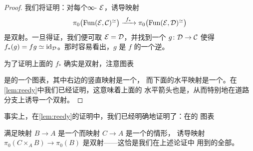 \begin{proof}
我们将证明：对每个∞-\trCategory{} $\mathcal{E}$，诱导映射
\[
\pi_0\bigl(\mathrm{Fun}(\mathcal{E}, \mathcal{C})^{\simeq}\bigr) \xrightarrow{\ f_*\ }
\pi_0\bigl(\mathrm{Fun}(\mathcal{E}, \mathcal{D})^{\simeq}\bigr)
\]
是双射。一旦得证，我们便可取 $\mathcal{E} = \mathcal{D}$，并找到一个\trFunctor{} $g\colon \mathcal{D} \to \mathcal{C}$
使得 $f_*(g) = fg \simeq \mathrm{id}_{\mathcal{D}}$。那时容易看出，$g$ 是 $f$ 的一个逆。

为了证明上面的 $f_*$ 确实是双射，注意图表
\begin{center}
\end{center}
是\trKanComplex{}的一个\trPullback{}图表，其中右边的竖直映射是一个\trKanFibration{}，
而下面的水平映射是一个\trHomotopyEquivalence{}。在\cref{lem:reedy}中我们已经证明，这意味着上面的
水平箭头也是\trHomotopyEquivalence{}，从而特别地在道路分支上诱导一个双射。
\end{proof}

\begin{remark}\label{rem:reedy-explicit}
事实上，在\cref{lem:reedy}的证明中，我们已经明确地证明了：在\trKanComplex{}的%
\trPullback{}图表
\begin{center}
\end{center}
满足映射 $B \to A$ 是一个\trKanFibration{}而映射 $C \to A$ 是一个\trHomotopyEquivalence{}的情形，
诱导映射 $\pi_0(C \times_A B) \to \pi_0(B)$ 是双射——这恰是我们在上述论证中
用到的全部。
\end{remark}

